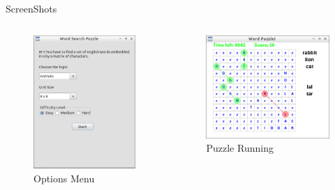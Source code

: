 \documentclass{beamer}
\begin{document}
\begin{frame}{ScreenShots}
\begin{columns}[c]
\begin{column}{4cm}
\begin{figure}
\includegraphics[scale=0.3]{opitons_gui.png}
\caption{Options Menu}
\end{figure}

\end{column}
\begin{column}{6cm}

\begin{figure}
\includegraphics[scale=0.4]{puzzle_running.png}
\caption{Puzzle Running}
\end{figure}
\end{column}
\end{columns}
\end{frame}
\end{document}
